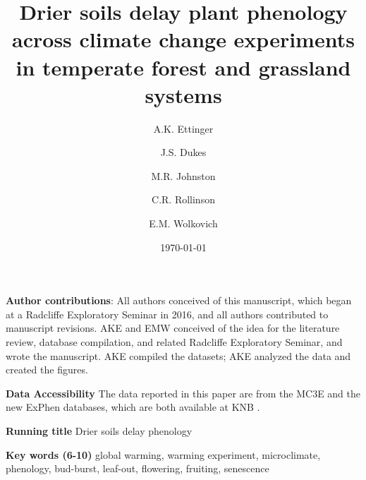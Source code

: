 \documentclass{article}
\begin{document}



\title{Drier soils delay plant phenology across climate change experiments in temperate forest and grassland systems} 
\author[1,2,a]{A.K. Ettinger}
\author[3,4,b]{J.S. Dukes}
\author[5,c]{M.R. Johnston}
\author[6,d]{C.R. Rollinson}
\author[1,7,e]{E.M. Wolkovich}










\date{\today}
\maketitle 
\textbf{Author contributions}: All authors conceived of this manuscript, which began at a Radcliffe Exploratory Seminar in 2016, and all authors contributed to manuscript revisions. AKE and EMW conceived of the idea for the literature review, database compilation, and related Radcliffe Exploratory Seminar, and wrote the manuscript. AKE compiled the datasets; AKE analyzed the data and created the figures.

\textbf{Data Accessibility} 
The data reported in this paper are from the MC3E and the new ExPhen databases, which are both available at KNB \citep{ettinger2018,ettinger2022}. 

\textbf{Running title} Drier soils delay phenology

\textbf{Key words (6-10)} global warming, warming experiment, microclimate, phenology, bud-burst, leaf-out, flowering, fruiting, senescence 
\end{document}
